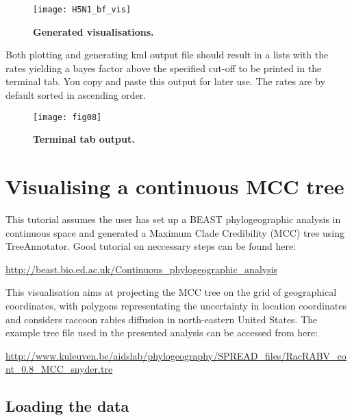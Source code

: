 \begin{figure}[H]
\begin{centering}
\texttt{[image: H5N1\_bf\_vis]}
\caption{
{ \footnotesize 
{\bf Generated visualisations.}
} %
}
\label{fig:07}
\par\end{centering}
\end{figure}

Both plotting and generating kml output file should result in a lists
with the rates yielding a bayes factor above the specified cut-off
to be printed in the terminal tab. You copy and paste this output
for later use. The rates are by default sorted in ascending order.


\begin{figure}[H]
\begin{centering}
\texttt{[image: fig08]}
\caption{
{ \footnotesize 
{\bf Terminal tab output.}
} %
}
\label{fig:08}
\par\end{centering}
\end{figure}

\section{Visualising a continuous MCC tree}

This tutorial assumes the user has set up a BEAST phylogeographic
analysis in continuous space and generated a Maximum Clade Credibility
(MCC) tree using TreeAnnotator. Good tutorial on neccessary steps
can be found here:

\url{http://beast.bio.ed.ac.uk/Continuous_phylogeographic_analysis}

\noindent
This visualisation aims at projecting the MCC tree on the grid of
geographical coordinates, with polygons representating the uncertainty
in location coordinates and considers raccoon rabies diffusion in
north-eastern United States. 
The example tree file used in the presented analysis can be accessed
from here:

\url{http://www.kuleuven.be/aidslab/phylogeography/SPREAD_files/RacRABV_cont_0.8_MCC_snyder.tre}


\subsection{Loading the data}


